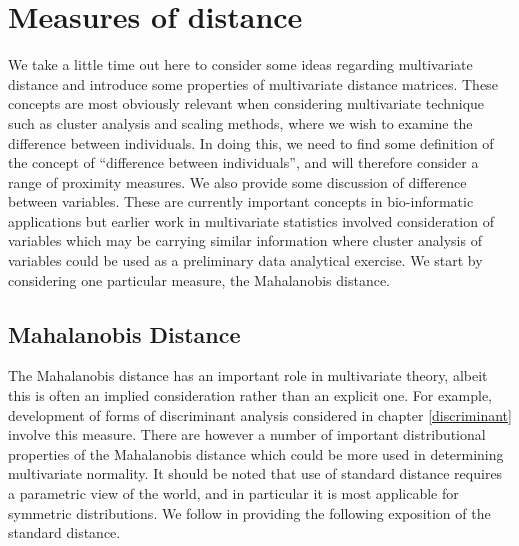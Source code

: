 


\chapter{Measures of distance}
\label{dist}

We take a little time out here to consider some ideas regarding multivariate distance and introduce some properties of multivariate distance matrices.   These concepts are most obviously relevant when considering multivariate technique such as cluster analysis and scaling methods, where we wish to examine the difference between individuals.   In doing this, we need to find some definition of the concept of ``difference between individuals'', and will therefore consider a range of proximity measures.   We also provide some discussion of difference between variables.   These are currently important concepts in bio-informatic applications but earlier work in multivariate statistics involved consideration of variables which may be carrying similar information where cluster analysis of variables could be used as a preliminary data analytical exercise.   We start by considering one particular measure, the Mahalanobis distance.

\section{Mahalanobis Distance}
\label{standarddist}

The Mahalanobis distance has an important role in multivariate theory, albeit this is often an implied consideration rather than an explicit one.   For example, development of forms of discriminant analysis considered in chapter \ref{discriminant} involve this measure.   There are however a number of important distributional properties of the Mahalanobis distance which could be more used in determining multivariate normality.    It should be noted that use of standard distance requires a parametric view of the world, and in particular it is most applicable for symmetric distributions.   We follow \cite{Flury:1997} in providing the following exposition of the standard distance.  

